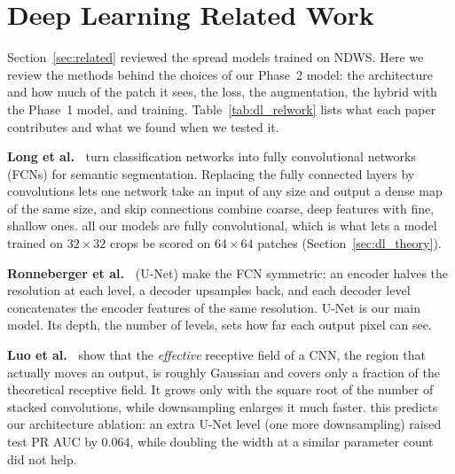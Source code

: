 
\section{Deep Learning Related Work}
\label{sec:dl_related}

Section~\ref{sec:related} reviewed the spread models trained on NDWS. Here we review the methods behind
the choices of our Phase~2 model: the architecture and how much of the patch it sees, the loss, the
augmentation, the hybrid with the Phase~1 model, and training. Table~\ref{tab:dl_relwork} lists what each
paper contributes and what we found when we tested it.

\textbf{Long et al.~\cite{long2015}} turn classification networks into fully convolutional networks (FCNs)
for semantic segmentation. Replacing the fully connected layers by convolutions lets one network take an
input of any size and output a dense map of the same size, and skip connections combine coarse, deep
features with fine, shallow ones. \relevance{} all our models are fully convolutional, which is what lets
a model trained on $32\times32$ crops be scored on $64\times64$ patches (Section~\ref{sec:dl_theory}).

\textbf{Ronneberger et al.~\cite{ronneberger2015}} (U-Net) make the FCN symmetric: an encoder halves the
resolution at each level, a decoder upsamples back, and each decoder level concatenates the encoder
features of the same resolution. \relevance{} U-Net is our main model. Its depth, the number of
levels, sets how far each output pixel can see.

\textbf{Luo et al.~\cite{luo2016}} show that the \emph{effective} receptive field of a CNN, the region
that actually moves an output, is roughly Gaussian and covers only a fraction of the theoretical receptive
field. It grows only with the square root of the number of stacked convolutions, while downsampling
enlarges it much faster. \relevance{} this predicts our architecture ablation: an extra U-Net level (one
more downsampling) raised test PR AUC by 0.064, while doubling the width at a similar parameter count did
not help.

